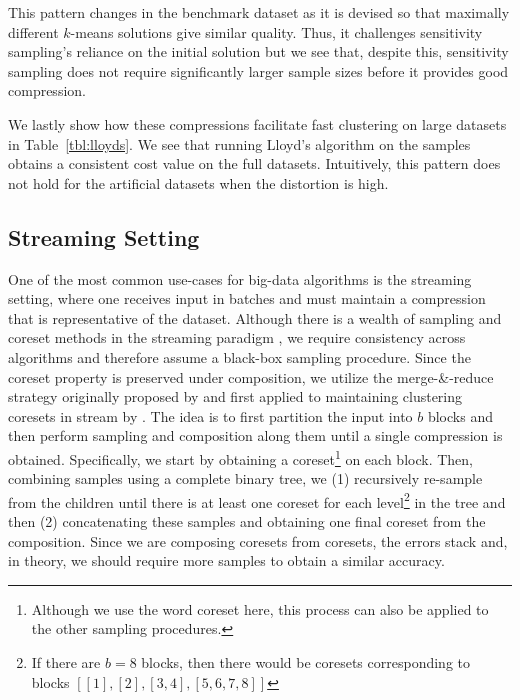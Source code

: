 This pattern changes in the benchmark dataset as it is devised so that maximally different $k$-means solutions give similar quality. Thus, it challenges
sensitivity sampling's reliance on the initial solution but we see that, despite this, sensitivity sampling does not require significantly larger sample sizes
before it provides good compression.

We lastly show how these compressions facilitate fast clustering on large datasets in Table~\ref{tbl:lloyds}. We see that running Lloyd's algorithm on
the samples obtains a consistent cost value on the full datasets. Intuitively, this pattern does not hold for the artificial datasets when the distortion is
high.




\subsection{Streaming Setting}
\label{ssec:streaming}

One of the most common use-cases for big-data algorithms is the streaming setting, where one receives input in batches and must maintain a compression that is
representative of the dataset. Although there is a wealth of sampling and coreset methods in the streaming paradigm , we require consistency
across algorithms and therefore assume a black-box sampling procedure. Since the coreset property is preserved under composition, we utilize the merge-\&-reduce
strategy originally proposed by \cite{BS80} and first applied to maintaining clustering coresets in stream by \cite{HaM01}. The idea is to first partition the
input into $b$ blocks and then perform sampling and composition along them until a single compression is obtained. Specifically, we start by obtaining
a coreset\footnote{Although we use the word coreset here, this process can also be applied to the other sampling procedures.} on each block. Then, combining
samples using a complete binary tree, we (1) recursively re-sample from the children until there is at least one coreset for each level\footnote{If there are
$b=8$ blocks, then there would be coresets corresponding to blocks $[[1], [2], [3, 4], [5, 6, 7, 8]]$} in the tree and then (2) concatenating these samples and
obtaining one final coreset from the composition. Since we are composing coresets from coresets, the errors stack and, in theory, we should require more samples
to obtain a similar accuracy. 

